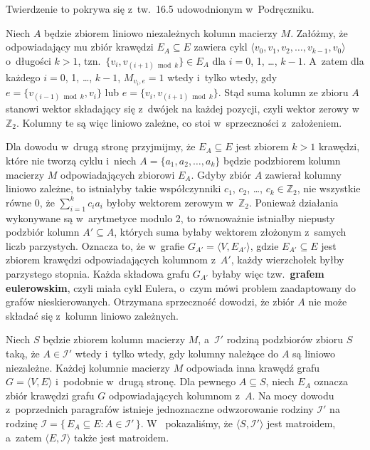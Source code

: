 
\subproblem %
Twierdzenie to pokrywa się z~tw.\ 16.5 udowodnionym w~Podręczniku.

\subproblem %

\noindent Niech $A$ będzie zbiorem liniowo niezależnych kolumn macierzy $M$.
Załóżmy, że odpowiadający mu zbiór krawędzi $E_A\subseteq E$ zawiera cykl $\langle v_0,v_1,v_2,\dots,v_{k-1},v_0\rangle$ o~długości $k>1$, tzn.\ $\{v_i,v_{(i+1)\bmod k}\}\in E_A$ dla $i=0$, 1, \dots, $k-1$.
A~zatem dla każdego $i=0$, 1, \dots, $k-1$, $M_{v_i,e}=1$ wtedy i~tylko wtedy, gdy $e=\bigl\{v_{(i-1)\bmod k},v_i\bigr\}$ lub $e=\bigl\{v_i,v_{(i+1)\bmod k}\bigr\}$.
Stąd suma kolumn ze zbioru $A$ stanowi wektor składający się z~dwójek na każdej pozycji, czyli wektor zerowy w~$\mathbb{Z}_2$.
Kolumny te są więc liniowo zależne, co stoi w~sprzeczności z~założeniem.

Dla dowodu w~drugą stronę przyjmijmy, że $E_A\subseteq E$ jest zbiorem $k>1$ krawędzi, które nie tworzą cyklu i~niech $A=\{a_1,a_2,\dots,a_k\}$ będzie podzbiorem kolumn macierzy $M$ odpowiadających zbiorowi $E_A$.
Gdyby zbiór $A$ zawierał kolumny liniowo zależne, to istniałyby takie współczynniki $c_1$, $c_2$, \dots, $c_k\in\mathbb{Z}_2$, nie wszystkie równe 0, że $\sum_{i=1}^kc_ia_i$ byłoby wektorem zerowym w~$\mathbb{Z}_2$.
Ponieważ działania wykonywane są w~arytmetyce modulo 2, to równoważnie istniałby niepusty podzbiór kolumn $A'\subseteq A$, których suma byłaby wektorem złożonym z~samych liczb parzystych.
Oznacza to, że w~grafie $G_{A'}=\langle V,E_{A'}\rangle$, gdzie $E_{A'}\subseteq E$ jest zbiorem krawędzi odpowiadających kolumnom z~$A'$, każdy wierzchołek byłby parzystego stopnia.
Każda składowa grafu $G_{A'}$ byłaby więc tzw.\ \textbf{grafem eulerowskim}, czyli miała cykl Eulera, o~czym mówi problem  zaadaptowany do grafów nieskierowanych.
Otrzymana sprzeczność dowodzi, że zbiór $A$ nie może składać się z~kolumn liniowo zależnych.

Niech $S$ będzie zbiorem kolumn macierzy $M$, a~$\mathcal{I}'$ rodziną podzbiorów zbioru $S$ taką, że $A\in\mathcal{I}'$ wtedy i~tylko wtedy, gdy kolumny należące do $A$ są liniowo niezależne.
Każdej kolumnie macierzy $M$ odpowiada inna krawędź grafu $G=\langle V,E\rangle$ i~podobnie w~drugą stronę.
Dla pewnego $A\subseteq S$, niech $E_A$ oznacza zbiór krawędzi grafu $G$ odpowiadających kolumnom z~$A$.
Na mocy dowodu z~poprzednich paragrafów istnieje jednoznaczne odwzorowanie rodziny $\mathcal{I}'$ na rodzinę $\mathcal{I}=\{\,E_A\subseteq E:A\in\mathcal{I}'\,\}$.
W~ pokazaliśmy, że $\langle S,\mathcal{I}'\rangle$ jest matroidem, a~zatem $\langle E,\mathcal{I}\rangle$ także jest matroidem.

